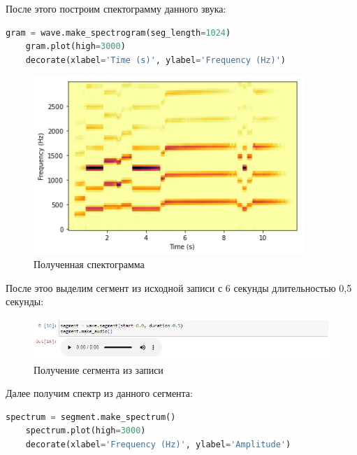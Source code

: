 \documentclass[a4paper]{article}
\begin{document}
            После этого построим спектограмму данного звука:
            
\begin{lstlisting}[language=Python, caption= Построение спектограммы]
    gram = wave.make_spectrogram(seg_length=1024)
    gram.plot(high=3000)
    decorate(xlabel='Time (s)', ylabel='Frequency (Hz)')
\end{lstlisting}               
            
            \begin{figure}[H]
                \centering
                \includegraphics{ex_4_spectogramma.png}
                \caption{Полученная спектограмма}
                \label{fig:ex_4_spectogramma}
            \end{figure}
            
            После этоо выделим сегмент из исходной записи с 6 секунды длительностью 0,5 секунды:
            
            \begin{figure}[H]
                \centering
                \includegraphics[width=\textwidth]{ex_4_segment_audio.png}
                \caption{Получение сегмента из записи}
                \label{fig:ex_4_segment_audio}
            \end{figure}
            
            Далее получим спектр из данного сегмента:
            
\begin{lstlisting}[language=Python, caption= Получение спектра сегмента]
    spectrum = segment.make_spectrum()
    spectrum.plot(high=3000)
    decorate(xlabel='Frequency (Hz)', ylabel='Amplitude')
\end{lstlisting}               
            
\end{document}
